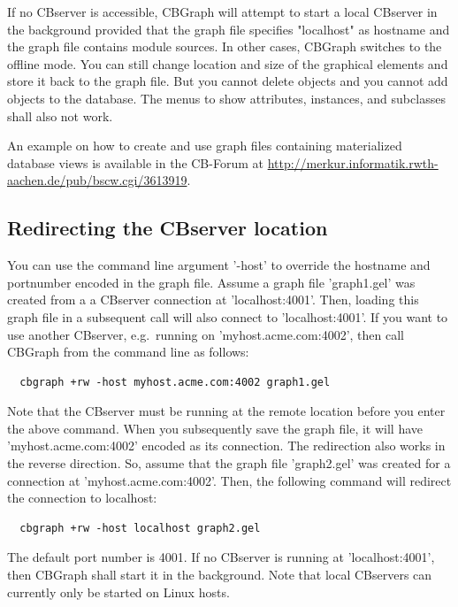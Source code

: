 If no CBserver is accessible, CBGraph will attempt to start a local CBserver in the background
provided that the graph file specifies "localhost" as hostname and the graph file contains module sources.
In other cases, CBGraph switches to the offline mode. You can still change location
and size of the graphical elements and store it back to the graph file. But you cannot delete
objects and you cannot add objects to the database. The menus to show attributes, instances,
and subclasses shall also not work.

An example on how to create and use graph files containing materialized database views
is available in the CB-Forum at
\url{http://merkur.informatik.rwth-aachen.de/pub/bscw.cgi/3613919}.

\subsection{Redirecting the CBserver location}

You can use the command line argument '-host' to override the hostname and portnumber encoded in
the graph file. Assume a graph file 'graph1.gel' was created from a a CBserver connection
at 'localhost:4001'.
Then, loading this graph file in a subsequent call will also connect to 'localhost:4001'. If you
want to use another CBserver, e.g.\ running on 'myhost.acme.com:4002', then call CBGraph 
from the command line as follows:

{\small
\begin{verbatim}
  cbgraph +rw -host myhost.acme.com:4002 graph1.gel
\end{verbatim}
}

Note that the CBserver must be running at the remote location before you enter the above command.
When you subsequently save the graph file, it will have 'myhost.acme.com:4002' encoded as its
connection. The redirection also works in the reverse direction. So, assume that the graph file
'graph2.gel'  was created for a connection at 'myhost.acme.com:4002'. Then, the following command
will redirect the connection to localhost:

{\small
\begin{verbatim}
  cbgraph +rw -host localhost graph2.gel
\end{verbatim}
}

The default port number is 4001. If no CBserver is running at 'localhost:4001', then CBGraph shall start
it in the background. Note that local CBservers can currently only be started on Linux hosts.



